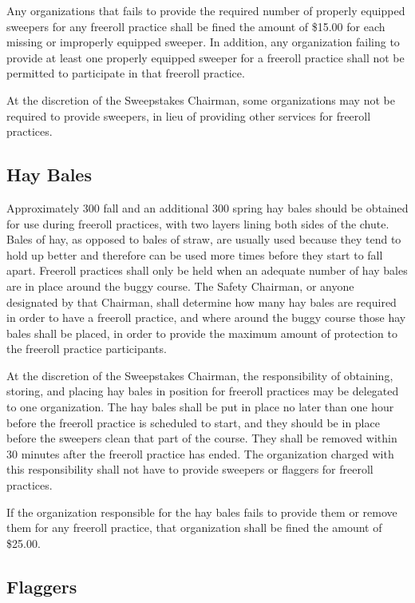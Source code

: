 	Any organizations that fails to provide the required number of properly
	equipped sweepers for any freeroll practice shall be fined the amount of
	\$15.00 for each missing or improperly equipped sweeper. In addition, any
	organization failing to provide at least one properly equipped sweeper for a
	freeroll practice shall not be permitted to participate in that freeroll
	practice.

	At the discretion of the Sweepstakes Chairman, some organizations may not be
	required to provide sweepers, in lieu of providing other services for freeroll
	practices.

\subsection{Hay Bales}

	Approximately 300 fall and an additional 300 spring hay bales should be 
	obtained for use during freeroll practices, with two layers lining both sides 
	of the chute. Bales of hay, as opposed to bales of straw, are usually used 
	because they tend to hold up better and therefore can be used more times before 
	they start to fall apart. Freeroll practices shall only be held when an adequate 
	number of hay bales are in place around the buggy course. The Safety Chairman, 
	or anyone designated by that Chairman, shall determine how many hay bales are 
	required in order to have a freeroll practice, and where around the buggy course 
	those hay bales shall be placed, in order to provide the maximum amount of 
	protection to the freeroll practice participants.

	At the discretion of the Sweepstakes Chairman, the responsibility of obtaining,
	storing, and placing hay bales in position for freeroll practices may be
	delegated to one organization. The hay bales shall be put in place no later
	than one hour before the freeroll practice is scheduled to start, and they
	should be in place before the sweepers clean that part of the course. They
	shall be removed within 30 minutes after the freeroll practice has ended. The
	organization charged with this responsibility shall not have to provide
	sweepers or flaggers for freeroll practices.

	If the organization responsible for the hay bales fails to provide them or
	remove them for any freeroll practice, that organization shall be fined the
	amount of \$25.00.

\subsection{Flaggers}

